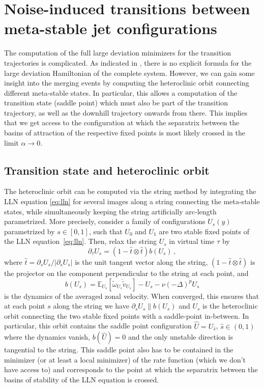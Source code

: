 \documentclass[12pt]{amsart}
\def\EE{\mathbb{E}}\def\PP{\mathbb{P}}
\begin{document}
\section{Noise-induced transitions between meta-stable jet configurations}

The computation of the full large deviation minimizers for the
transition trajectories is complicated. As indicated in
\cite{bouchet-grafke-tangarife-etal:2016}, there is no explicit
formula for the large deviation Hamiltonian of the complete
system. However, we can gain some insight into the merging events by
computing the heteroclinic orbit connecting different meta-stable
states. In particular, this allows a computation of the transition
state (saddle point) which must also be part of the transition
trajectory, as well as the downhill trajectory onwards from
there. This implies that we get access to the configuration at which
the separatrix between the basins of attraction of the respective
fixed points is most likely crossed in the limit $\alpha\to0$.

\subsection{Transition state and heteroclinic orbit}

The heteroclinic orbit can be computed via the string method
\cite{e-ren-vanden-eijnden:2002} by integrating the LLN equation
\eqref{eq:lln} for several images along a string connecting the
meta-stable states, while simultaneously keeping the string
artificially arc-length parametrized. More precisely, consider a
family of configurations $U_s(y)$ parametrized by $s\in[0,1]$, such
that $U_0$ and $U_1$ are two stable fixed points of the LLN
equation~\eqref{eq:lln}. Then, relax the string $U_s$ in virtual
time $\tau$ by
\begin{equation}
  \partial_\tau U_s = (1-\hat t\otimes \hat t)b(U_s)\,,
\end{equation}
where $\hat t = \partial_s U_s/|\partial_s U_s|$ is the unit tangent
vector along the string, $(1-\hat t\otimes \hat t)$ is the projector
on the component perpendicular to the string at each point, and
\begin{equation*}
    b(U_s) = \EE_{U_s}\left[\overline{\tilde\omega_{U_s} \tilde v_{U_s}}\right] -U_s - \nu (-\Delta)^p U_s  
\end{equation*}
is the dynamics of the averaged zonal velocity. When converged, this
ensures that at each point $s$ along the string we have $\partial_s
U_s \parallel b(U_s)$ and $U_s$ is the heteroclinic orbit connecting
the two stable fixed points with a saddle-point in-between. In
particular, this orbit contains the saddle point configuration $\hat U
= U_{\hat s}$, $\hat s\in(0,1)$ where the dynamics vanish, $b(\hat
U)=0$ and the only unstable direction is tangential to the
string. This saddle point also has to be contained in the minimizer
(or at least a local minimizer) of the rate function (which we don't
have access to) and corresponds to the point at which the separatrix
between the basins of stability of the LLN equation is crossed.
\end{document}
